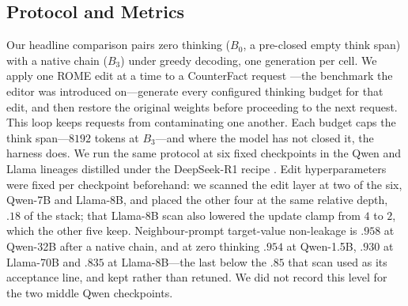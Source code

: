 \documentclass[letterpaper]{article} %
\begin{document}
\subsection{Protocol and Metrics}
\label{sec:gap-protocol}

Our headline comparison pairs zero thinking (\(B_0\), a pre-closed empty think span) with a native chain (\(B_3\)) under greedy decoding, one generation per cell.  We apply one ROME edit at a time to a CounterFact request \citep{meng2022rome}---the benchmark the editor was introduced on---generate every configured thinking budget for that edit, and then restore the original weights before proceeding to the next request.  This loop keeps requests from contaminating one another.  Each budget caps the think span---\(8192\) tokens at \(B_3\)---and where the model has not closed it, the harness does.  We run the same protocol at six fixed checkpoints in the Qwen and Llama lineages distilled under the DeepSeek-R1 recipe \citep{deepseekai2025r1}.  Edit hyperparameters were fixed per checkpoint beforehand: we scanned the edit layer at two of the six, Qwen-7B and Llama-8B, and placed the other four at the same relative depth, \(.18\) of the stack; that Llama-8B scan also lowered the update clamp from \(4\) to \(2\), which the other five keep.  Neighbour-prompt target-value non-leakage is \(.958\) at Qwen-32B after a native chain, and at zero thinking \(.954\) at Qwen-1.5B, \(.930\) at Llama-70B and \(.835\) at Llama-8B---the last below the \(.85\) that scan used as its acceptance line, and kept rather than retuned.  We did not record this level for the two middle Qwen checkpoints. %
\end{document}
